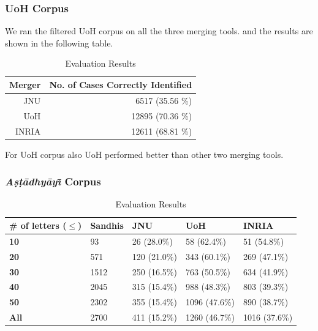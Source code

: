 \documentclass[11pt]{article}
\begin{document}
\subsubsection{UoH Corpus}
We ran the filtered UoH corpus on all the three merging tools. and the results are shown in the following table.

\begin{table}[h]
	\begin{center}
		\begin{tabular}{| r | r | }
			\hline  \bf Merger & \bf No. of Cases Correctly Identified \\
			\hline
			JNU & 6517 (35.56 \%) \\ \hline
			UoH & 12895 (70.36 \%) \\ \hline
			INRIA & 12611 (68.81 \%)\\ \hline
			\hline
		\end{tabular}
	\end{center}
	\caption{\label{font-table} Evaluation Results }
\end{table}

For UoH corpus also UoH performed better than other two merging tools. 
\subsubsection{\textit{A\d{s}\d{t}\={a}dhy\={a}y\={\i}} Corpus}

\begin{table}[h]
	\begin{center}
		\begin{tabular}{|p{1cm} | p{1cm}|p{1.2cm} | p{1.2cm} | p{1.2cm} |}
			\hline  
			\bf \# of letters ($\le$) & Sandhis & JNU & UoH & INRIA\\
			\hline
			\bf	10	&	93	&	26 (28.0\%)	&	58 (62.4\%)	&	51 (54.8\%)	\\	\hline
\bf	20	&	571	&	120 (21.0\%)	&	343 (60.1\%)	&	269 (47.1\%)	\\	\hline
\bf	30	&	1512	&	250 (16.5\%)	&	763 (50.5\%)	&	634 (41.9\%)	\\	\hline
\bf	40	&	2045	&	315 (15.4\%)	&	988 (48.3\%)	&	803 (39.3\%)	\\	\hline
\bf	50	&	2302	&	355 (15.4\%)	&	1096 (47.6\%)	&	890 (38.7\%)	\\	\hline
\bf	All	&	2700	&	411 (15.2\%)	&	1260 (46.7\%)	&	1016 (37.6\%)	\\	\hline
			\hline
		\end{tabular}
	\end{center}
	\caption{\label{font-table} Evaluation Results }
\end{table}
\end{document}
